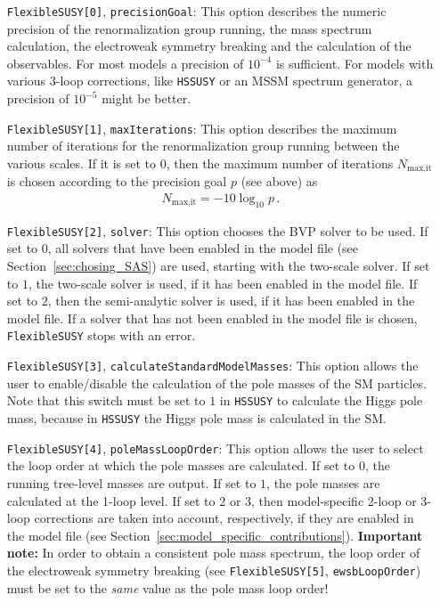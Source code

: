 \documentclass[final,3p,11pt,pdflatex]{elsarticle}
\makeatletter
\newcommand{\modelname}[1]{\texttt{#1}\@\xspace}
\newcommand{\fs}{\texttt{FlexibleSUSY}\@\xspace}
\newcommand{\HSSUSY}{\modelname{HSSUSY}}
\newcommand{\secref}[1]{Section~\ref{#1}}
\makeatother
\begin{document}
\begin{itemize}
\item[\texttt{FlexibleSUSY[0]},] \texttt{precisionGoal}: This option
  describes the numeric precision of the renormalization group
  running, the mass spectrum calculation, the electroweak symmetry
  breaking and the calculation of the observables.  For most models a
  precision of $10^{-4}$ is sufficient.  For models with various
  3-loop corrections, like \HSSUSY or an MSSM spectrum generator, a
  precision of $10^{-5}$ might be better.

\item[\texttt{FlexibleSUSY[1]},] \texttt{maxIterations}: This option
  describes the maximum number of iterations for the renormalization
  group running between the various scales.  If it is set to $0$, then
  the maximum number of iterations $N_{\text{max,it}}$ is chosen
  according to the precision goal $p$ (see above) as
  \begin{align}
    N_{\text{max,it}} = - 10\log_{10} p \,.
  \end{align}

\item[\texttt{FlexibleSUSY[2]},] \texttt{solver}: This option chooses
  the BVP solver to be used.  If set to $0$, all
  solvers that have been enabled in the model file (see
  \secref{sec:chosing_SAS}) are used, starting with the two-scale
  solver.  If set to $1$, the two-scale solver is used, if it has been
  enabled in the model file.  If set to $2$, then the semi-analytic
  solver is used, if it has been enabled in the model file.  If a
  solver that has not been enabled in the model file is chosen, \fs
  stops with an error.

\item[\texttt{FlexibleSUSY[3]},]
  \texttt{calculateStandardModelMasses}: This option allows the user
  to enable/disable the calculation of the pole masses of the SM
  particles.  Note that this switch must be set to $1$ in
  \HSSUSY to calculate the Higgs pole mass, because in \HSSUSY the
  Higgs pole mass is calculated in the SM\@.

\item[\texttt{FlexibleSUSY[4]},] \texttt{poleMassLoopOrder}: This
  option allows the user to select the loop order at which the pole
  masses are calculated.  If set to $0$, the running tree-level masses
  are output.  If set to $1$, the pole masses are calculated at the
  1-loop level.  If set to $2$ or $3$, then model-specific 2-loop or
  3-loop corrections are taken into account, respectively, if they are
  enabled in the model file (see
  \secref{sec:model_specific_contributions}).  \textbf{Important
    note:} In order to obtain a consistent pole mass spectrum, the
  loop order of the electroweak symmetry breaking (see
  \texttt{FlexibleSUSY[5]}, \texttt{ewsbLoopOrder}) must be set to the
  \emph{same} value as the pole mass loop order!


\end{itemize}
\end{document}
